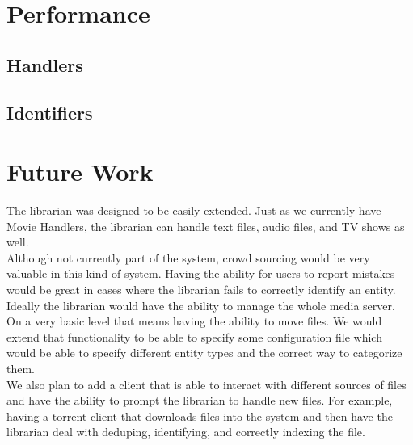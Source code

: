 \documentclass[paper=a4, fontsize=11pt]{scrartcl} %
\numberwithin{equation}{section} %
\numberwithin{figure}{section} %
\numberwithin{table}{section} %
\begin{document}
\section{Performance}
\label{sec:performance}


\subsection{Handlers}
\label{sec:handlers}

\subsection{Identifiers}
\label{sec:identifiers}



\section{Future Work}
\label{sec:future-work}

The librarian was designed to be easily extended. Just as we currently have Movie Handlers, the librarian can handle text files, audio files, and TV shows as well. \\

Although not currently part of the system, crowd sourcing would be very valuable in this kind of system. Having the ability for users to report mistakes would be great in cases where the librarian fails to correctly identify an entity. \\

Ideally the librarian would have the ability to manage the whole media server. On a very basic level that means having the ability to move files. We would extend that functionality to be able to specify some configuration file which would be able to specify different entity types and the correct way to categorize them. \\

We also plan to add a client that is able to interact with different sources of files and have the ability to prompt the librarian to handle new files. For example, having a torrent client that downloads files into the system and then have the librarian deal with deduping, identifying, and correctly indexing the file. \\
\end{document}
